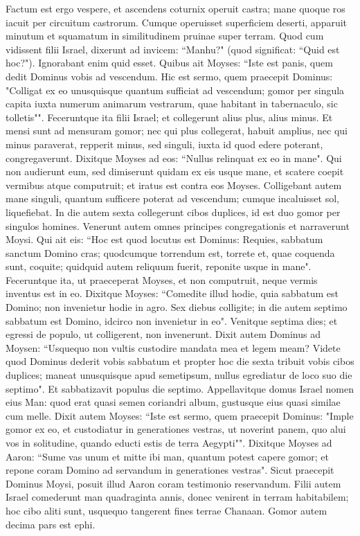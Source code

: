 \begin{biblechapter}
\verse Factum est ergo vespere, et ascendens coturnix operuit castra; mane quoque ros iacuit per circuitum castrorum. 
\verse Cumque operuisset superficiem deserti, apparuit minutum et squamatum in similitudinem pruinae super terram. 
\verse Quod cum vidissent filii Israel, dixerunt ad invicem: “Manhu?" (quod significat: “Quid est hoc?"). Ignorabant enim quid esset. Quibus ait Moyses: “Iste est panis, quem dedit Dominus vobis ad vescendum. 
\verse Hic est sermo, quem praecepit Dominus: "Colligat ex eo unusquisque quantum sufficiat ad vescendum; gomor per singula capita iuxta numerum animarum vestrarum, quae habitant in tabernaculo, sic tolletis"". 
\verse Feceruntque ita filii Israel; et collegerunt alius plus, alius minus.  
\verse Et mensi sunt ad mensuram gomor; nec qui plus collegerat, habuit amplius, nec qui minus paraverat, repperit minus, sed singuli, iuxta id quod edere poterant, congregaverunt. 
\verse Dixitque Moyses ad eos: “Nullus relinquat ex eo in mane". 
\verse Qui non audierunt eum, sed dimiserunt quidam ex eis usque mane, et scatere coepit vermibus atque computruit; et iratus est contra eos Moyses. 
\verse Colligebant autem mane singuli, quantum sufficere poterat ad vescendum; cumque incaluisset sol, liquefiebat. 
\verse In die autem sexta collegerunt cibos duplices, id est duo gomor per singulos homines. Venerunt autem omnes principes congregationis et narraverunt Moysi.  
\verse Qui ait eis: “Hoc est quod locutus est Dominus: Requies, sabbatum sanctum Domino cras; quodcumque torrendum est, torrete et, quae coquenda sunt, coquite; quidquid autem reliquum fuerit, reponite usque in mane". 
\verse Feceruntque ita, ut praeceperat Moyses, et non computruit, neque vermis inventus est in eo.  
\verse Dixitque Moyses: “Comedite illud hodie, quia sabbatum est Domino; non invenietur hodie in agro. 
\verse Sex diebus colligite; in die autem septimo sabbatum est Domino, idcirco non invenietur in eo". 
\verse Venitque septima dies; et egressi de populo, ut colligerent, non invenerunt. 
\verse Dixit autem Dominus ad Moysen: “Usquequo non vultis custodire mandata mea et legem meam? 
\verse Videte quod Dominus dederit vobis sabbatum et propter hoc die sexta tribuit vobis cibos duplices; maneat unusquisque apud semetipsum, nullus egrediatur de loco suo die septimo". 
\verse Et sabbatizavit populus die septimo. 
\verse Appellavitque domus Israel nomen eius Man: quod erat quasi semen coriandri album, gustusque eius quasi similae cum melle. 
\verse Dixit autem Moyses: “Iste est sermo, quem praecepit Dominus: "Imple gomor ex eo, et custodiatur in generationes vestras, ut noverint panem, quo alui vos in solitudine, quando educti estis de terra Aegypti"". 
\verse Dixitque Moyses ad Aaron: “Sume vas unum et mitte ibi man, quantum potest capere gomor; et repone coram Domino ad servandum in generationes vestras". 
\verse Sicut praecepit Dominus Moysi, posuit illud Aaron coram testimonio reservandum. 
\verse Filii autem Israel comederunt man quadraginta annis, donec venirent in terram habitabilem; hoc cibo aliti sunt, usquequo tangerent fines terrae Chanaan.  
\verse Gomor autem decima pars est ephi. 
\end{biblechapter}

